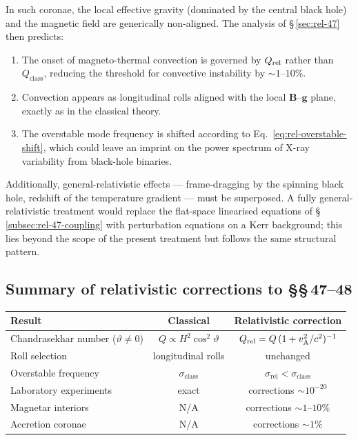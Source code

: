 In such coronae, the local effective gravity (dominated by the central
black hole) and the magnetic field are generically non-aligned.  The
analysis of \S\,\ref{sec:rel-47} then predicts:
\begin{enumerate}
  \item The onset of magneto-thermal convection is governed by $Q_{\mathrm{rel}}$
    rather than $Q_{\mathrm{class}}$, reducing the threshold for
    convective instability by $\sim 1$--$10\%$.
  \item Convection appears as longitudinal rolls aligned with the
    local $\mathbf{B}$--$\mathbf{g}$ plane, exactly as in the
    classical theory.
  \item The overstable mode frequency is shifted according to
    Eq.~\eqref{eq:rel-overstable-shift}, which could leave an imprint
    on the power spectrum of X-ray variability from black-hole
    binaries.
\end{enumerate}

Additionally, general-relativistic effects --- frame-dragging by the
spinning black hole, redshift of the temperature gradient --- must be
superposed.  A fully general-relativistic treatment would replace the
flat-space linearised equations of \S\,\ref{subsec:rel-47-coupling} with
perturbation equations on a Kerr background; this lies beyond the scope
of the present treatment but follows the same structural pattern.

\subsection{Summary of relativistic corrections to \S\S\,47--48}
\label{subsec:rel-47-48-summary}

\begin{center}
\begin{tabular}{lcc}
\hline
Result & Classical & Relativistic correction \\
\hline
Chandrasekhar number ($\vartheta\neq 0$) & $Q \propto H^{2}\cos^{2}\!\vartheta$
  & $Q_{\mathrm{rel}} = Q\,(1+v_{\mathrm{A}}^{2}/c^{2})^{-1}$ \\[3pt]
Roll selection & longitudinal rolls & unchanged \\[3pt]
Overstable frequency & $\sigma_{\mathrm{class}}$
  & $\sigma_{\mathrm{rel}} < \sigma_{\mathrm{class}}$ \\[3pt]
Laboratory experiments & exact & corrections $\sim 10^{-20}$ \\[3pt]
Magnetar interiors & N/A & corrections $\sim 1$--$10\%$ \\[3pt]
Accretion coronae & N/A & corrections $\sim 1\%$ \\
\hline
\end{tabular}
\end{center}

